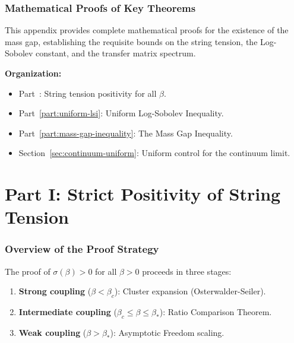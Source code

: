 %
%
%

\section{Mathematical Proofs of Key Theorems}
\label{sec:app143-proofs}

This appendix provides complete mathematical proofs for the existence of the mass gap,
establishing the requisite bounds on the string tension, the Log-Sobolev constant,
and the transfer matrix spectrum.

\textbf{Organization:}
\begin{itemize}
\item Part~\ref{part:tension-positivity}: String tension positivity for all $\beta$.
\item Part~\ref{part:uniform-lsi}: Uniform Log-Sobolev Inequality.
\item Part~\ref{part:mass-gap-inequality}: The Mass Gap Inequality.
\item Section~\ref{sec:continuum-uniform}: Uniform control for the continuum limit.
\end{itemize}

\part{Part I: Strict Positivity of String Tension}
\label{part:tension-positivity}

\section{Overview of the Proof Strategy}
\label{sec:tension-overview}

The proof of $\sigma(\beta) > 0$ for all $\beta > 0$ proceeds in three stages:
\begin{enumerate}
\item \textbf{Strong coupling} ($\beta < \beta_c$): Cluster expansion (Osterwalder-Seiler).
\item \textbf{Intermediate coupling} ($\beta_c \leq \beta \leq \beta_*$): Ratio Comparison Theorem.
\item \textbf{Weak coupling} ($\beta > \beta_*$): Asymptotic Freedom scaling.
\end{enumerate}

